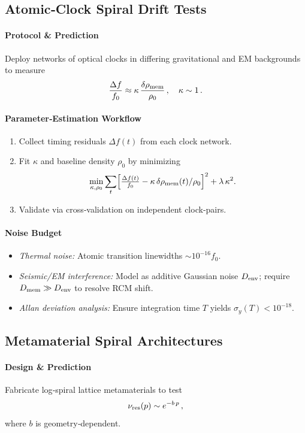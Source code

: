 \subsection{Atomic‐Clock Spiral Drift Tests}
\paragraph{Protocol \& Prediction}
Deploy networks of optical clocks in differing gravitational and EM backgrounds to measure  
\[
\frac{\Delta f}{f_0} \approx \kappa\,\frac{\delta\rho_{\rm mem}}{\rho_0}\,,\quad \kappa\sim1\,.
\]
\paragraph{Parameter‐Estimation Workflow}
\begin{enumerate}
  \item Collect timing residuals $\Delta f(t)$ from each clock network.
  \item Fit $\kappa$ and baseline density $\rho_0$ by minimizing 
  \[
    \min_{\kappa,\rho_0}\sum_t\Bigl[\tfrac{\Delta f(t)}{f_0}
    -\kappa\,\delta\rho_{\rm mem}(t)/\rho_0\Bigr]^2
    +\lambda\,\kappa^2.
  \]
  \item Validate via cross‐validation on independent clock‐pairs.
\end{enumerate}
\paragraph{Noise Budget}
\begin{itemize}
  \item \emph{Thermal noise:} Atomic transition linewidths $\sim10^{-16} f_0$.  
  \item \emph{Seismic/EM interference:} Model as additive Gaussian noise $D_{\rm env}$; require $D_{\rm mem}\gg D_{\rm env}$ to resolve RCM shift.  
  \item \emph{Allan deviation analysis:} Ensure integration time $T$ yields $\sigma_y(T)<10^{-18}$.
\end{itemize}

\subsection{Metamaterial Spiral Architectures}
\paragraph{Design \& Prediction}
Fabricate log‐spiral lattice metamaterials to test  
\[
\nu_{\rm res}(p)\sim e^{-b\,p}\,,
\]
where $b$ is geometry‐dependent.
